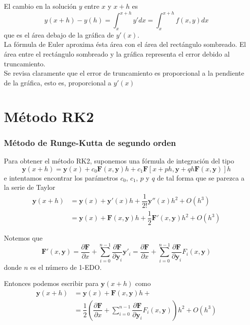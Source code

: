 \begin{frame}
El cambio en la solución $y$ entre $x$ y $x+h$ es
\[ y(x+h) - y(h) = \int_{x}^{x+h} y' dx = \int_{x}^{x+h} f(x,y) dx \]
que es el área debajo de la gráfica de $y'(x)$.
\\
\medskip
La fórmula de Euler aproxima ésta área con el área del rectángulo sombreado. El área entre el rectángulo sombreado y la gráfica representa el error debido al truncamiento.
\\
\medskip
Se revisa claramente que el error de truncamiento es proporcional a la pendiente de la gráfica, esto es, proporcional a $y'(x)$
\end{frame}
\section{Método RK2}
\begin{frame}
\frametitle{Método de Runge-Kutta de segundo orden}
Para obtener el método RK2, suponemos una fórmula de integración del tipo
\fontsize{12}{12}\selectfont
\[ \mathbf{y}(x+h) = \mathbf{y}(x) + c_{0} \mathbf{F}(x,\mathbf{y})h + c_{1} \mathbf{F}[x+ph, \mathbf{y}+qh \mathbf{F}(x,\mathbf{y})] h \]
\fontsize{14}{14}\selectfont
e intentamos encontrar los parámetros $c_{0}$, $c_{1}$, $p$ y $q$ de tal forma que se parezca a la serie de Taylor
\[ \begin{split}
\mathbf{y}(x+h) &= \mathbf{y}(x) + \mathbf{y}'(x) h + \dfrac{1}{2!}\mathbf{y}''(x) h^{2} + O(h^{3}) \\
&= \mathbf{y}(x) + \mathbf{F}(x,\mathbf{y}) h + \dfrac{1}{2}\mathbf{F}'(x,\mathbf{y}) h^{2} + O(h^{3})
\end{split} \]
\end{frame}
\begin{frame}
Notemos que
\[ \mathbf{F}'(x,\mathbf{y}) = \dfrac{\partial \mathbf{F}}{\partial x} + \sum_{i=0}^{n-1} \dfrac{\partial \mathbf{F}}{\partial \mathbf{y}_{i}} \mathbf{y}'_{i} = \dfrac{\partial \mathbf{F}}{\partial x} + \sum_{i=0}^{n-1} \dfrac{\partial \mathbf{F}}{\partial \mathbf{y}_{i}} F_{i}(x,\mathbf{y})\]
donde $n$ es el número de 1-EDO.
\end{frame}
\begin{frame}
Entonces podemos escribir para $\mathbf{y}(x+h)$ como
\[ \begin{split}
\mathbf{y}(x+h) &= \mathbf{y}(x) + \mathbf{F}(x,\mathbf{y})h + \\
&= \dfrac{1}{2} \left( \dfrac{\partial \mathbf{F}}{\partial x} + \sum_{i=0}^{n-1} \dfrac{\partial \mathbf{F}}{\partial \mathbf{y}_{i}} F_{i}(x,\mathbf{y}) \right) h^{2} + O(h^{3})
\end{split} \]
\end{frame}
